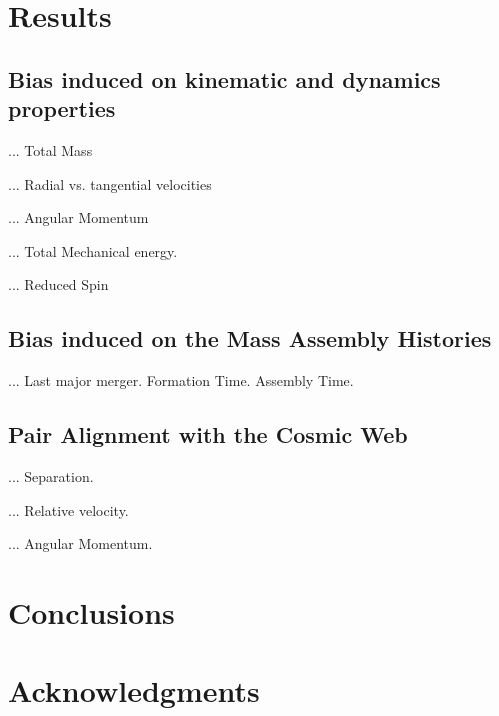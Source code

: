 \documentclass[usenatbib]{latex/mn2e}
\begin{document}
\section{Results}
\label{sec:Results}

\subsection{Bias induced on kinematic and dynamics properties}
\label{subsec:bias_kinematic}

... Total Mass

... Radial vs. tangential velocities

... Angular Momentum

... Total Mechanical energy.

... Reduced Spin


\subsection{Bias induced on the Mass Assembly Histories}
\label{subsec:bias_MAH}

... Last major merger. Formation Time. Assembly Time.

\subsection{Pair Alignment with the Cosmic Web}
\label{subsec:alignment_cosmic_web}

... Separation.

... Relative velocity.

... Angular Momentum.


\section{Conclusions}
\label{sec:conclusions}


\section*{Acknowledgments}  



 
\end{document}
